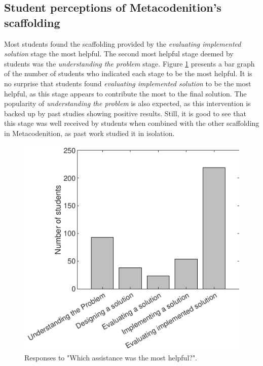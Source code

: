 \documentclass[sigconf,authorversion,nonacm]{acmart}
\begin{document}
\subsection{Student perceptions of Metacodenition's scaffolding}
Most students found the scaffolding provided by the \emph{evaluating implemented solution} stage the most helpful. The second most helpful stage deemed by students was the \emph{understanding the problem} stage. Figure \ref{fig:interventions} presents a bar graph of the number of students who indicated each stage to be the most helpful. It is no surprise that students found \emph{evaluating implemented solution} to be the most helpful, as this stage appears to contribute the most to the final solution. The popularity of \emph{understanding the problem} is also expected, as this intervention is backed up by past studies showing positive results. Still, it is good to see that this stage was well received by students when combined with the other scaffolding in Metacodenition, as past work studied it in isolation.

\begin{figure}[h!]
  \centering
  \includegraphics[width=\columnwidth]{intervention_responses}
  \caption{Responses to "Which assistance was the most helpful?".}
  \label{fig:interventions}
\end{figure}
\end{document}
